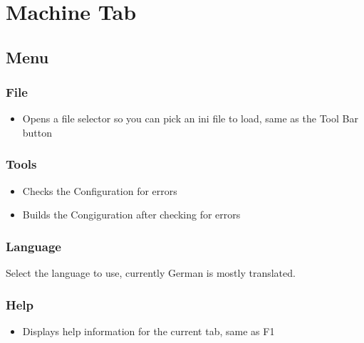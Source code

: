 \documentclass[letterpaper,10pt,english,openany,oneside]{sphinxmanual}
\begin{document}
\chapter{Machine Tab}
\label{\detokenize{machine:machine-tab}}\label{\detokenize{machine::doc}}


\section{Menu}
\label{\detokenize{machine:menu}}

\subsection{File}
\label{\detokenize{machine:file}}\begin{itemize}
\item {} 
 \sphinxhyphen{} Opens a file selector so you can pick an ini file
to load, same as the Tool Bar button

\end{itemize}


\subsection{Tools}
\label{\detokenize{machine:tools}}\begin{itemize}
\item {} 
 \sphinxhyphen{} Checks the Configuration for errors

\item {} 
 \sphinxhyphen{} Builds the Congiguration after checking for errors

\end{itemize}


\subsection{Language}
\label{\detokenize{machine:language}}
Select the language to use, currently German is mostly translated.


\subsection{Help}
\label{\detokenize{machine:help}}\begin{itemize}
\item {} 
 \sphinxhyphen{} Displays help information for the current tab, same as F1

\end{itemize}
\end{document}
